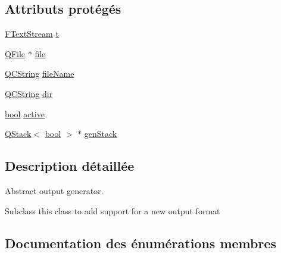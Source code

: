 \subsection*{Attributs protégés}
\begin{DoxyCompactItemize}
\item 
\hyperlink{class_f_text_stream}{F\+Text\+Stream} \hyperlink{class_output_generator_a55a40a8215efe6adc4d0a587ad9a46bc}{t}
\item 
\hyperlink{class_q_file}{Q\+File} $\ast$ \hyperlink{class_output_generator_aed5ad11c3844cdf71ec6fee6c1c84286}{file}
\item 
\hyperlink{class_q_c_string}{Q\+C\+String} \hyperlink{class_output_generator_a9bb808101dbeae7732bb0fa66cad9176}{file\+Name}
\item 
\hyperlink{class_q_c_string}{Q\+C\+String} \hyperlink{class_output_generator_ac64b8818d57bbe250f647d7b10edd45e}{dir}
\item 
\hyperlink{qglobal_8h_a1062901a7428fdd9c7f180f5e01ea056}{bool} \hyperlink{class_output_generator_a1e1299d64814f58ac06b257992291f9f}{active}
\item 
\hyperlink{class_q_stack}{Q\+Stack}$<$ \hyperlink{qglobal_8h_a1062901a7428fdd9c7f180f5e01ea056}{bool} $>$ $\ast$ \hyperlink{class_output_generator_ac734ecb37a17e3b4fa46f249ab495697}{gen\+Stack}
\end{DoxyCompactItemize}


\subsection{Description détaillée}
Abstract output generator.

Subclass this class to add support for a new output format 

\subsection{Documentation des énumérations membres}
\hypertarget{class_output_generator_ab79b5d3c19d95c8a5929c07f5b2918cf}{}
